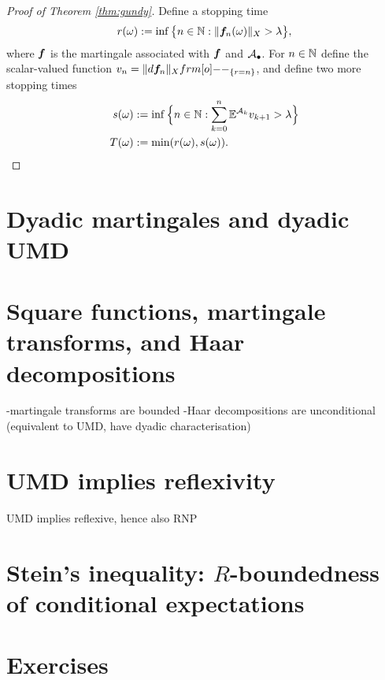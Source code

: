 \begin{proof}[Proof of Theorem \ref{thm:gundy}]
  Define a stopping time
  \begin{equation*}
    r(\omega) := \inf\big\{ n \in \mathbb{N} : \|\bm{f}_{n}(\omega)\|_{X} > \lambda \big\},
  \end{equation*}
  where $\bm{f}$ is the martingale associated with $\bm{f}$ and $\mathcal{A}_{\bullet}$.
  For $n \in \mathbb{N}$ define the scalar-valued function $v_{n} = \|d\mb{f}_{n}\|_{X} \1_{\{r = n\}}$, and define two more stopping times
  \begin{equation*}
    \begin{aligned}
      s(\omega) &:= \inf\Big\{ n \in \mathbb{N} : \sum_{k=0}^{n} \mathbb{E}^{\mathcal{A}_{k}} v_{k+1} > \lambda \Big\} \\
      T(\omega) &:= \min(r(\omega), s(\omega)).
    \end{aligned}
  \end{equation*}
  
\end{proof}

\section{Dyadic martingales and dyadic UMD}

\section{Square functions, martingale transforms, and Haar decompositions}

-martingale transforms are bounded
-Haar decompositions are unconditional (equivalent to UMD, have dyadic characterisation)


\section{UMD implies reflexivity}

UMD implies reflexive, hence also RNP


\section{Stein's inequality: $R$-boundedness of conditional expectations}




\section*{Exercises}

